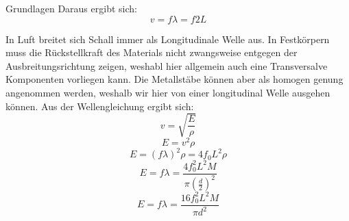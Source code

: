 \documentclass[twoside]{protokoll}
\begin{document}
\begin{aufgabe}{Grundlagen}
    Daraus ergibt sich:
    \begin{equation}
        v = f \lambda = f 2 L
    \end{equation}

    In Luft breitet sich Schall immer als Longitudinale Welle aus.
    In Festkörpern muss die Rückstellkraft des Materials nicht zwangsweise entgegen der Ausbreitungsrichtung zeigen, weshabl hier allgemein auch eine Transversalve Komponenten vorliegen kann.
    Die Metallstäbe können aber als homogen genung angenommen werden, weshalb wir hier von einer longitudinal Welle ausgehen können.
    Aus der Wellengleichung ergibt sich:
    \begin{equation}
         v = \sqrt{\frac{E}{\rho}}
    \end{equation}
    \begin{equation}
         E = v ^2 \rho
    \end{equation}
    \begin{equation}
        E = (f \lambda)^2 \rho = 4 f_0 L ^2 \rho
    \end{equation}
    \begin{equation}
        E = f \lambda = \frac{ 4 f_0^2 L ^2 M}{\pi (\frac{d}{2}) ^2}
    \end{equation}
    \begin{equation}
        E = f \lambda = \frac{ 16 f_0^2 L ^2 M}{\pi d ^2}
    \end{equation}

     
\end{aufgabe}
\end{document}
